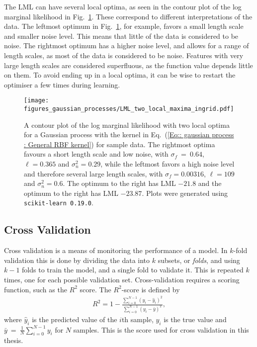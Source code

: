 \documentclass[twoside,english]{uiofysmaster}
\begin{document}
{{The LML can have several local optima, as seen in the contour plot of the log marginal likelihood in Fig.~\ref{Fig:: gaussian process : LML several local optima}. These correspond to different interpretations of the data. The leftmost optimum in Fig.~\ref{Fig:: gaussian process : LML several local optima}, for example, favors a small length scale and smaller noise level. This means that little of the data is considered to be noise. The rightmost optimum has a higher noise level, and allows for a range of length scales, as most of the data is considered to be noise. Features with very large length scales are considered superfluous, as the function value depends little on them. To avoid ending up in a local optima, it can be wise to restart the optimiser a few times during learning.

\begin{figure}
\centering
\texttt{[image: figures\_gaussian\_processes/LML\_two\_local\_maxima\_ingrid.pdf]}
\caption{A contour plot of the log marginal likelihood with two local optima for a Gaussian process with the kernel in Eq.~(\ref{Eq:: gaussian process : General RBF kernel}) for sample data. The rightmost optima favours a short length scale and low noise, with $\sigma_f~=~0.64$, $\ell = 0.365$ and $\sigma^2_n = 0.29$, while the leftmost favors a high noise level and therefore several large length scales, with $\sigma_f = 0.00316$, $\ell = 109$ and $\sigma^2_n = 0.6$. The optimum to the right has LML $-21.8$ and the optimum to the right has LML $-23.87$. Plots were generated using {\tt scikit-learn 0.19.0}.}
\label{Fig:: gaussian process : LML several local optima}
\end{figure}



\subsection{Cross Validation}\label{Sec:: gaussian process : Cross Validation}


Cross validation is a means of monitoring the performance of a model. In $k$-fold validation this is done by dividing the data into $k$ subsets, or \textit{folds}, and using $k-1$ folds to train the model, and a single fold to validate it. This is repeated $k$ times, one for each possible validation set. Cross-validation requires a scoring function, such as the $R^2$ score. The $R^2$-score is defined by 
\begin{align}
R^2 = 1 - \frac{\sum_{i=0}^{N-1} (y_i - \hat{y}_i)^2}{\sum_{i=0}^{N-1} (y_i - \bar{y})^2},
\end{align}
where $\hat{y}_i$ is the predicted value of the $i$th sample, $y_i$ is the true value and $\bar{y}~=~\frac{1}{N} \sum_{i = 0}^{N-1} y_i$ for $N$ samples. This is the score used for cross validation in this thesis.

}}
\end{document}
